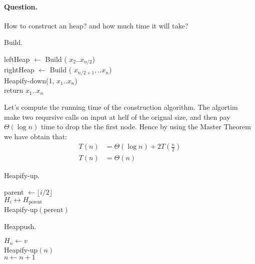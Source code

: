 \paragraph{Question.} How to construct an heap? and how much time it will take?  

\begin{algbox}{Build.}
\begin{algorithm}[H]
{}
leftHeap $ \leftarrow $ Build ( $x_2 .. x_{n/2} $) \\ 
rightHeap $ \leftarrow $ Build ( $x_{n/2 +1 }, .. x_{n}$) \\
Heapify-down(1, $x_1 .. x_{n}$) \\
return $x_{1} .. x_{n}$
\end{algorithm}
\end{algbox}

Let's compute the running time of the construction algorithm. The algortim make two reqursive calls on input at helf of the orignal size, and then pay $\Theta\left( \log n \right)$ time to drop the the first node. Hence by using the Master Theorem we have obtain that: 
\begin{equation*}
  \begin{split}
    T\left( n \right) &= \Theta \left( \log n \right) + 2T\left( \frac{n}{2} \right) \\ 
    T\left( n \right) &= \Theta\left(  n  \right) 
  \end{split}
\end{equation*}

\begin{algbox}{Heapify-up.}
\begin{algorithm}[H]
{}
parent $\leftarrow \lfloor i/2 \rfloor $ \\
 { 
  $ H_{i} \leftrightarrow H_{\text{perent}} $ \\ 
  Heapify-up$\left( \text{perent}  \right)$
}
\end{algorithm}
\end{algbox}



\begin{algbox}{Heappush.}
\begin{algorithm}[H]
{}
$ H_{n} \leftarrow v $ \\ 
Heapify-up$\left( n \right)$\\
$ n \leftarrow n + 1 $ 
\end{algorithm}
\end{algbox}

